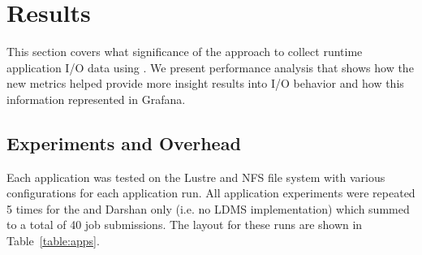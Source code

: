 \section{Results}
\label{sec:results}

This section covers what significance of the approach to collect
runtime application I/O data using \Darshan{}. We present performance
analysis that shows how the new metrics helped provide more insight
results into I/O behavior and how this information represented
in Grafana.

\subsection{Experiments and Overhead}
Each application was tested on the Lustre and NFS file system with various configurations for each application run. All application experiments were repeated 5 times for the \connector{} and Darshan only (i.e. no LDMS implementation) which summed to a total of 40 job submissions. The layout for these runs are shown in Table~\ref{table:apps}.  

